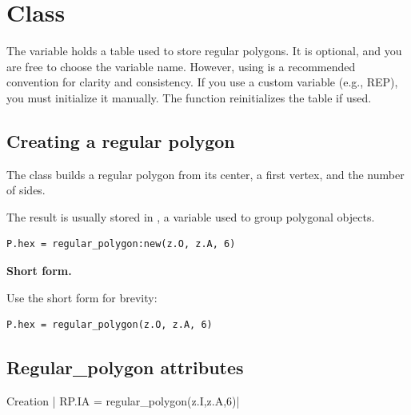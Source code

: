 \newpage
\section{Class }

The variable  holds a table used to store regular polygons. It is optional, and you are free to choose the variable name. However, using  is a recommended convention for clarity and consistency. If you use a custom variable (e.g., REP), you must initialize it manually. The  function reinitializes the  table if used.


\subsection{Creating a regular polygon}

The  class builds a regular polygon from its center, a first vertex, and the number of sides.

\medskip
The result is usually stored in , a variable used to group polygonal objects.

\begin{mybox}
\begin{verbatim}
P.hex = regular_polygon:new(z.O, z.A, 6)
\end{verbatim}
\end{mybox}

\textbf{Short form.}

Use the short form for brevity:

\begin{mybox}
\begin{verbatim}
P.hex = regular_polygon(z.O, z.A, 6)
\end{verbatim}
\end{mybox}

\subsection{Regular\_polygon attributes}
\label{sub:regular_polygon_attributes}

\begin{mybox}
Creation | RP.IA = regular_polygon(z.I,z.A,6)|
\end{mybox}


